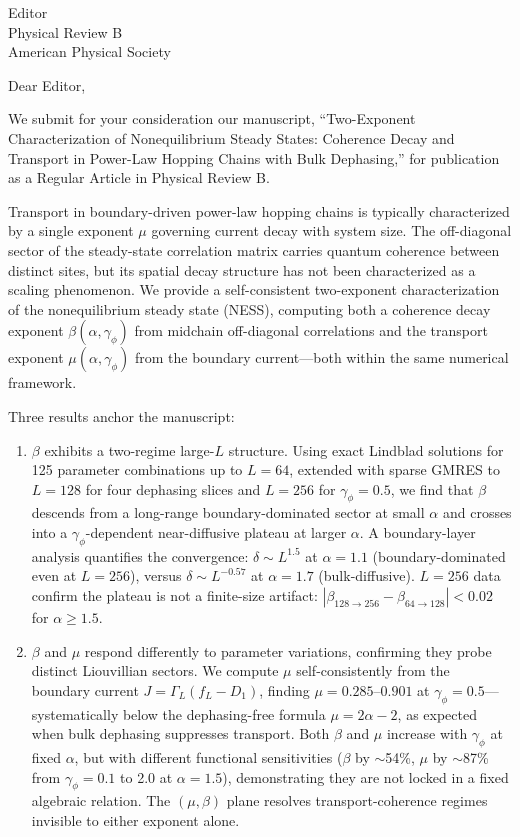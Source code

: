 \documentclass[11pt]{letter}
\date{June 5, 2026}
\begin{document}
\begin{letter}{Editor\\Physical Review B\\American Physical Society}

\opening{Dear Editor,}

We submit for your consideration our manuscript, ``Two-Exponent Characterization of Nonequilibrium Steady States: Coherence Decay and Transport in Power-Law Hopping Chains with Bulk Dephasing,'' for publication as a Regular Article in Physical Review B.

Transport in boundary-driven power-law hopping chains is typically characterized by a single exponent $\mu$ governing current decay with system size. The off-diagonal sector of the steady-state correlation matrix carries quantum coherence between distinct sites, but its spatial decay structure has not been characterized as a scaling phenomenon. We provide a self-consistent two-exponent characterization of the nonequilibrium steady state (NESS), computing both a coherence decay exponent $\beta(\alpha,\gamma_\phi)$ from midchain off-diagonal correlations and the transport exponent $\mu(\alpha,\gamma_\phi)$ from the boundary current---both within the same numerical framework.

Three results anchor the manuscript:

\begin{enumerate}
\item $\beta$ exhibits a two-regime large-$L$ structure. Using exact Lindblad solutions for 125 parameter combinations up to $L=64$, extended with sparse GMRES to $L=128$ for four dephasing slices and $L=256$ for $\gamma_\phi=0.5$, we find that $\beta$ descends from a long-range boundary-dominated sector at small $\alpha$ and crosses into a $\gamma_\phi$-dependent near-diffusive plateau at larger $\alpha$. A boundary-layer analysis quantifies the convergence: $\delta \sim L^{1.5}$ at $\alpha=1.1$ (boundary-dominated even at $L=256$), versus $\delta \sim L^{-0.57}$ at $\alpha=1.7$ (bulk-diffusive). $L=256$ data confirm the plateau is not a finite-size artifact: $|\beta_{128\to256} - \beta_{64\to128}| < 0.02$ for $\alpha \ge 1.5$.

\item $\beta$ and $\mu$ respond differently to parameter variations, confirming they probe distinct Liouvillian sectors. We compute $\mu$ self-consistently from the boundary current $J = \Gamma_L(f_L-D_1)$, finding $\mu = 0.285$--$0.901$ at $\gamma_\phi=0.5$---systematically below the dephasing-free formula $\mu=2\alpha-2$, as expected when bulk dephasing suppresses transport. Both $\beta$ and $\mu$ increase with $\gamma_\phi$ at fixed $\alpha$, but with different functional sensitivities ($\beta$ by $\sim$54\%, $\mu$ by $\sim$87\% from $\gamma_\phi=0.1$ to 2.0 at $\alpha=1.5$), demonstrating they are not locked in a fixed algebraic relation. The $(\mu,\beta)$ plane resolves transport-coherence regimes invisible to either exponent alone.


\end{enumerate}
\end{letter}
\end{document}
